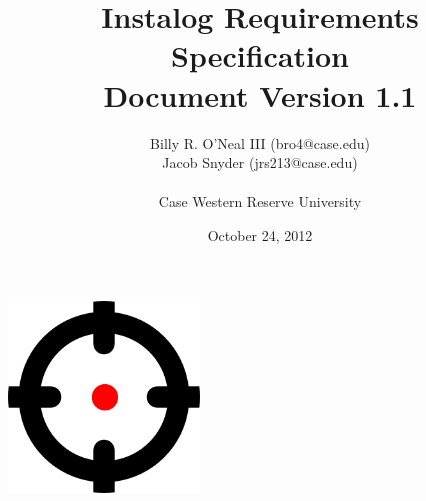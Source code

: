 \documentclass[letterpaper,12pt]{article}
\title{Instalog Requirements Specification \\
Document Version 1.1}
\author{
Billy R. O'Neal III (bro4@case.edu) \\
Jacob Snyder (jrs213@case.edu) \\ \\
Case Western Reserve University
}
\date{October 24, 2012}
\begin{document}
\maketitle
\vspace{1in}
\begin{center}
\includegraphics[width=2in, height=2in]{figures/InstalogLogo.png}
\end{center}
\newpage

\tableofcontents
\newpage


\newpage


\newpage


\newpage


\newpage


\newpage


\clearpage


\newpage


\newpage


\end{document}

